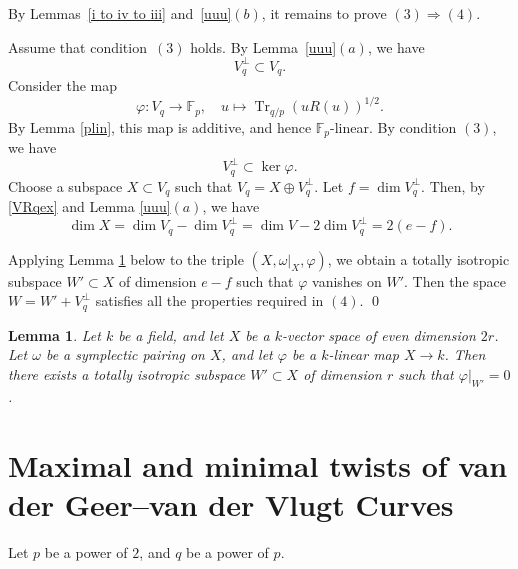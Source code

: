 \documentclass[12pt,a4paper]{amsart}
\newtheorem{lemma}[theorem]{Lemma}
\theoremstyle{definition}
\def\F{{\mathbb F}}
\theoremstyle{remark}
\DeclareMathOperator{\Tr}{Tr}
\begin{document}
{By Lemmas~\ref{i to iv to iii} and~\ref{uuu}$(b)$, it remains to prove $(3)\Rightarrow(4)$. 

Assume that condition~$(3)$ holds. By Lemma~\ref{uuu}$(a)$, we have 
\[V_q^\perp\subset V_q.\]
Consider the map 
\[
\varphi \colon V_{q}\to\F_p, \quad u \mapsto \Tr_{q/p}(uR(u))^{1/2}.
\]
By Lemma \ref{plin}, this map is additive, and hence $\F_p$-linear. By condition $(3)$, we have 
\[
V_{q}^\perp\subset \ker \varphi. 
\]
Choose a subspace $X\subset V_{q}$ such that $V_{q}=X\oplus V_{q}^\perp$. Let $f=\dim V_{q}^\perp$. Then, by \eqref{VRqex} and Lemma \ref{uuu}$(a)$, we have 
\[
\dim X=\dim V_q-\dim V_q^{\perp}=\dim V-2 \dim V_q^{\perp}=
2(e-f). 
\]

Applying Lemma \ref{tis} below to the triple $(X,\omega|_X,\varphi)$, we obtain a totally isotropic subspace $W'\subset X$ of dimension $e-f$ such that  $\varphi$ vanishes on $W'$. Then the space $W=W'+V_{q}^\perp$ satisfies all the properties required in $(4)$. 
\qed}

\begin{lemma}\label{tis}
Let $k$ be a field, and let $X$ be a $k$-vector space of even dimension $2r$. Let $\omega$ be a symplectic pairing on $X$, and let $\varphi$ be a $k$-linear map $X\to k$. Then there exists a totally isotropic subspace $W'\subset X$ of dimension $r$  such that $\varphi|_{W'}=0$. 
\end{lemma}


\section{Maximal and minimal twists of van der Geer--van der Vlugt Curves}\label{max2}
Let $p$ be a power of $2$, and $q$ be a power of $p$. 
\end{document}
